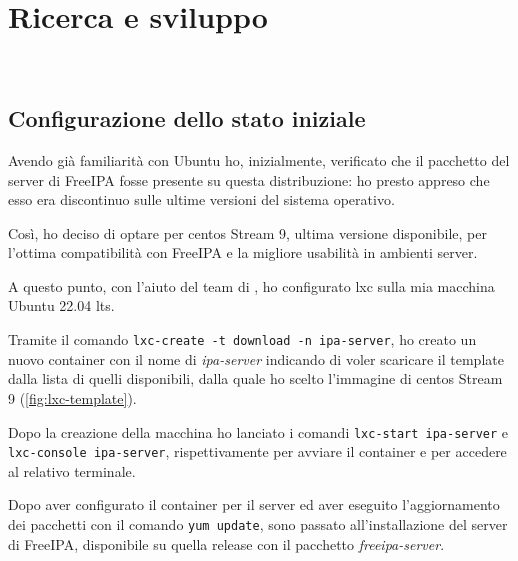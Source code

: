 
\chapter{Ricerca e sviluppo}
\label{cap:ricerca-sperimentazione}

\\

\section{Configurazione dello stato iniziale}

Avendo già familiarità con Ubuntu ho, inizialmente, verificato che il pacchetto del server di FreeIPA fosse presente su questa distribuzione: ho presto appreso che esso era discontinuo sulle ultime versioni del sistema operativo.

Così, ho deciso di optare per \acrshort{centos} Stream 9, ultima versione disponibile, per l'ottima compatibilità con FreeIPA e la migliore usabilità in ambienti server.

A questo punto, con l'aiuto del team di \myAzienda, ho configurato \acrshort{lxc} sulla mia macchina Ubuntu 22.04 \acrfull{lts}.

Tramite il comando \texttt{lxc-create -t download -n ipa-server}, ho creato un nuovo container con il nome di \emph{ipa-server} indicando di voler scaricare il template dalla lista di quelli disponibili, dalla quale ho scelto l'immagine di \acrshort{centos} Stream 9 (\autoref{fig:lxc-template}).

Dopo la creazione della macchina ho lanciato i comandi \texttt{lxc-start ipa-server} e \texttt{lxc-console ipa-server}, rispettivamente per avviare il container e per accedere al relativo terminale.


Dopo aver configurato il container per il server ed aver eseguito l'aggiornamento dei pacchetti con il comando \texttt{yum update}, sono passato all'installazione del server di FreeIPA, disponibile su quella release con il pacchetto \emph{freeipa-server}.


